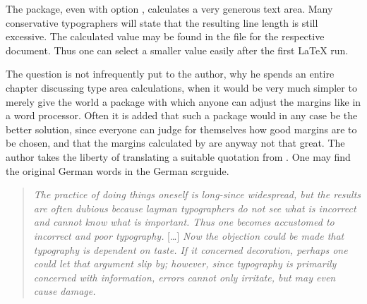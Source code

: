 The  package, even with option ,
calculates a very generous text area.  Many conservative typographers
will state that the resulting line length is still excessive. The
calculated  value may be found in the  file for the
respective document.  Thus one can select a smaller value easily after
the first {\LaTeX} run.

The question is not infrequently put to the author, why he spends an
entire chapter discussing type area calculations, when it would be
very much simpler to merely give the world a package with which anyone
can adjust the margins like in a word processor.  Often it is added
that such a package would in any case be the better solution, since
everyone can judge for themselves how good margins are to be chosen,
and that the margins calculated by {\KOMAScript} are anyway not that
great.  The author takes the liberty of translating a suitable
quotation from \cite{TYPO:ErsteHilfe}. One may find the original
German words in the German scrguide.

\begin{quote}
  \label{sec:typearea.tips.cite}%
  \textit{The practice of doing things oneself is long-since
    widespread, but the results are often dubious because layman
    typographers do not see what is incorrect and cannot know what is
    important. Thus one becomes accustomed to incorrect and poor
    typography.} [\dots] \textit{Now the objection could be made that
    typography is dependent on taste. If it concerned decoration,
    perhaps one could let that argument slip by; however, since
    typography is primarily concerned with information, errors cannot
    only irritate, but may even cause damage.}
\end{quote}

